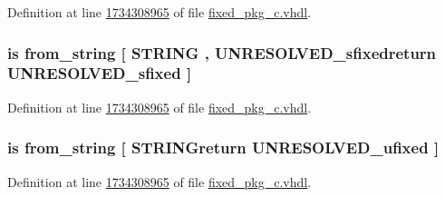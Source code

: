 Definition at line \hyperlink{fixed__pkg__c_8vhdl_source_l1734308965}{1734308965} of file \hyperlink{fixed__pkg__c_8vhdl_source}{fixed\+\_\+pkg\+\_\+c.\+vhdl}.

\hypertarget{classfixed__pkg_a6b28cd3c63eda48c2c2f1bb7fba726fc}{}
\subsubsection[{from\+\_\+bstring}]{ {\bfseries \textcolor{keywordflow}{is}\textcolor{vhdlchar}{ }\textcolor{vhdlchar}{from\+\_\+string}\textcolor{vhdlchar}{ }\textcolor{vhdlchar}{\mbox{[}}\textcolor{vhdlchar}{ }\textcolor{comment}{S\+T\+R\+I\+N\+G}\textcolor{vhdlchar}{ }\textcolor{vhdlchar}{,}\textcolor{vhdlchar}{ }\textcolor{vhdlchar}{U\+N\+R\+E\+S\+O\+L\+V\+E\+D\+\_\+sfixedreturn}\textcolor{vhdlchar}{ }{\bfseries {\bf U\+N\+R\+E\+S\+O\+L\+V\+E\+D\+\_\+sfixed}} \textcolor{vhdlchar}{ }\textcolor{vhdlchar}{\mbox{]}}\textcolor{vhdlchar}{ }} \hspace{0.3cm}{\ttfamily [Alias]}}\label{classfixed__pkg_a6b28cd3c63eda48c2c2f1bb7fba726fc}


Definition at line \hyperlink{fixed__pkg__c_8vhdl_source_l1734308965}{1734308965} of file \hyperlink{fixed__pkg__c_8vhdl_source}{fixed\+\_\+pkg\+\_\+c.\+vhdl}.

\hypertarget{classfixed__pkg_aef58272e8d4a4d71cf8e739793aaf721}{}
\subsubsection[{from\+\_\+bstring}]{ {\bfseries \textcolor{keywordflow}{is}\textcolor{vhdlchar}{ }\textcolor{vhdlchar}{from\+\_\+string}\textcolor{vhdlchar}{ }\textcolor{vhdlchar}{\mbox{[}}\textcolor{vhdlchar}{ }\textcolor{vhdlchar}{S\+T\+R\+I\+N\+Greturn}\textcolor{vhdlchar}{ }{\bfseries {\bf U\+N\+R\+E\+S\+O\+L\+V\+E\+D\+\_\+ufixed}} \textcolor{vhdlchar}{ }\textcolor{vhdlchar}{\mbox{]}}\textcolor{vhdlchar}{ }} \hspace{0.3cm}{\ttfamily [Alias]}}\label{classfixed__pkg_aef58272e8d4a4d71cf8e739793aaf721}


Definition at line \hyperlink{fixed__pkg__c_8vhdl_source_l1734308965}{1734308965} of file \hyperlink{fixed__pkg__c_8vhdl_source}{fixed\+\_\+pkg\+\_\+c.\+vhdl}.

